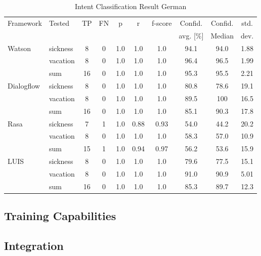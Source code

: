 \begin{table}[h]
    \centering
    \begin{tabular}{ l | l | c | c | c | c | c | c | c | c }
        \multirow{2}{*}{Framework} & \multirow{2}{*}{Tested} & \multirow{2}{*}{TP} & \multirow{2}{*}{FN} & \multirow{2}{*}{p} & \multirow{2}{*}{r} & \multirow{2}{*}{f-score} & Confid. & Confid. & std.\\ 
                 &&          &            &   & & & avg. [\%] & Median & dev.  \\ \hline \hline
        \multirow{3}{*}{Watson} 
        & sickness & 8 & 0& 1.0& 1.0& 1.0&94.1& 94.0& 1.88\\
        & vacation & 8 & 0& 1.0& 1.0& 1.0&96.4& 96.5&1.99\\
        & sum      &16 & 0& 1.0& 1.0& 1.0&95.3& 95.5&2.21 \\ \hline
        
        \multirow{3}{*}{Dialogflow} 
        & sickness & 8& 0& 1.0& 1.0& 1.0&80.8& 78.6&19.1\\
        & vacation & 8& 0& 1.0& 1.0& 1.0&89.5& 100& 16.5\\
        & sum      &16& 0& 1.0& 1.0& 1.0&85.1&90.3 &17.8\\ \hline

        \multirow{3}{*}{Rasa} 
        & sickness & 7& 1& 1.0& 0.88  & 0.93& 54.0& 44.2&20.2\\
        & vacation & 8& 0& 1.0& 1.0& 1.0& 58.3& 57.0&10.9\\
        & sum      &15& 1& 1.0& 0.94& 0.97& 56.2&53.6 &15.9\\ \hline

        \multirow{3}{*}{LUIS} 
        & sickness & 8& 0& 1.0& 1.0 & 1.0& 79.6& 77.5&15.1\\
        & vacation & 8& 0& 1.0& 1.0 & 1.0& 91.0& 90.9&5.01\\
        & sum      & 16&0& 1.0& 1.0 & 1.0& 85.3& 89.7&12.3\\
    \end{tabular}
    \caption{Intent Classification Result German} \label{tab:intent_classification_result_de}
\end{table} \noindent

\subsection*{Training Capabilities}
\subsection*{Integration}
